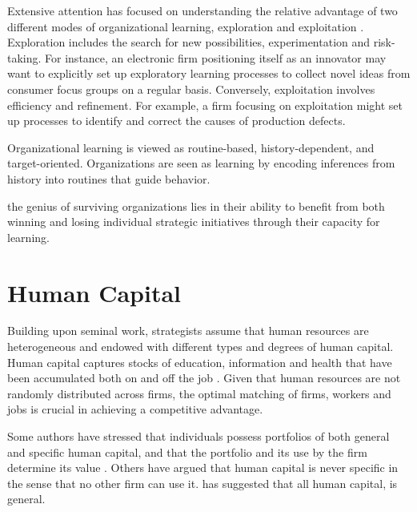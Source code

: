 \documentclass[12pt,letterpaper]{article}
\begin{document}
Extensive attention has focused on understanding the relative advantage of two different modes of organizational learning, exploration and exploitation \cite{March1991a}. Exploration includes the search for new possibilities, experimentation and risk-taking. For instance, an electronic firm positioning itself as an innovator may want to explicitly set up exploratory learning processes to collect novel ideas from consumer focus groups on a regular basis. Conversely, exploitation involves efficiency and refinement. For example, a firm focusing on exploitation might set up processes to identify and correct the causes of production defects.

Organizational learning is viewed as routine-based, history-dependent, and target-oriented. Organizations are seen as learning by encoding inferences from history into routines that guide behavior.

\cite{Burgelman1991} the genius of surviving organizations lies in their ability to benefit from both winning and losing individual strategic initiatives through their capacity for learning.
\section{Human Capital}
Building upon \cite{Becker1962} seminal work, strategists assume that human resources are heterogeneous and endowed with different types and degrees of human capital. Human capital captures stocks of education, information and health that have been accumulated both on and off the job \citep{Becker1962}. Given that human resources are not randomly distributed across firms, the optimal
matching of firms, workers and jobs is crucial in achieving a competitive advantage.

Some authors have stressed that individuals possess portfolios of both general and specific human capital, and that the portfolio and its use by the firm determine its value \citep{Campbell2012}. Others have argued that human capital is never specific in the sense that no other firm can use it. \cite{Lazear2009} has suggested that all human capital, is general.
\end{document}
